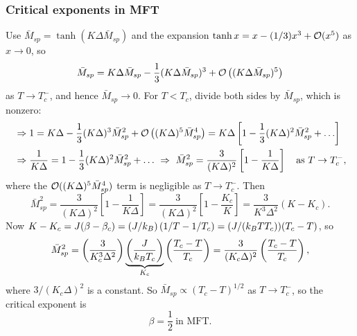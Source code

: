 \subsubsection*{Critical exponents in MFT}

Use $\bar M_{sp} = \tanh(K\Delta\bar M_{sp})$ and the expansion
$\tanh x = x - (1/3)x^3 + \mathcal{O}(x^5)$ as $x\to 0$, so
\begin{equation}
  \bar M_{sp} = K\Delta\bar M_{sp} - \frac{1}{3}(K\Delta\bar M_{sp})^3 + \mathcal{O}\left((K\Delta\bar M_{sp})^5\right)
\end{equation}
as $T\to T_c^-$, and hence $\bar M_{sp}\to 0$. For $T<T_c$, divide both sides by $\bar M_{sp}$, which
is nonzero:
\begin{align}
  &\Rightarrow 1 = K\Delta - \frac{1}{3}(K\Delta)^3\bar M_{sp}^2 + \mathcal{O}\left((K\Delta)^5\bar M_{sp}^4\right)
    = K\Delta\left[1-\frac{1}{3}(K\Delta)^2\bar M_{sp}^2+\ldots\right]\nonumber\\
  &\Rightarrow\frac{1}{K\Delta} = 1-\frac{1}{3}(K\Delta)^2\bar M_{sp}^2+\ldots
  \ \Rightarrow\ \bar M_{sp}^2 = \frac{3}{(K\Delta)^2}\left[1-\frac{1}{K\Delta}\right]
  \quad\text{as } T\to T_c^-,
\end{align}
where the $\mathcal{O}((K\Delta)^5\bar M_{sp}^4)$ term is negligible as $T\to T_c^-$. Then
\begin{equation}
  \bar M_{sp}^2 = \frac{3}{(K\Delta)^2}\left[1-\frac{1}{K\Delta}\right]
  = \frac{3}{(K\Delta)^2}\left[1-\frac{K_c}{K}\right] = \frac{3}{K^3\Delta^2}(K-K_c).
\end{equation}
Now $K-K_c = J(\beta-\beta_c) = (J/k_{B})\left(1/T-1/T_c\right) = (J/(k_{B} TT_c))(T_c-T)$,
so
\begin{equation}
  \bar M_{sp}^2 = \left(\frac{3}{K_c^3\Delta^2}\right)\underbrace{\left(\frac{J}{k_{B} T_c}\right)}_{K_c}\left(\frac{T_c-T}{T_c}\right)
  = \frac{3}{(K_c\Delta)^2}\left(\frac{T_c-T}{T_c}\right),
\end{equation}
where $3/(K_c\Delta)^2$ is a constant. So $\bar M_{sp}\propto(T_c-T)^{1/2}$ as $T\to T_c^-$, so the
critical exponent is
\begin{equation}
  \boxed{\beta = \frac{1}{2}\ \text{in MFT}}.
\end{equation}

